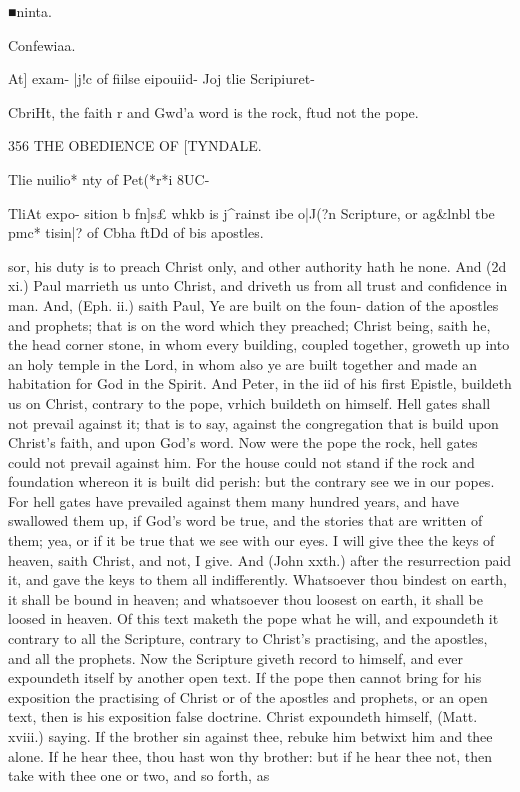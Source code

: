 \documentclass{custom}
\begin{document}
{■ninta. 

Confewiaa. 

At] exam- 
|j!c of fiilse 
eipouiid- 
Joj tlie 
Scripiuret- 

CbriHt, the 
faith r and 
Gwd'a word 
is the rock, 
ftud not the 
pope. 


356
THE OBEDIENCE OF
[TYNDALE.

Tlie nuilio* 
nty of 
Pet(*r*i 8UC- 

TliAt expo- 
sition b 
fn]s£ whkb 
is j^rainst 
ibe o|J(?n 
Scripture, 
or ag&lnbl 
tbe pmc* 
tisin|? of 
Cbha ftDd 
of bis 
apostles. 

sor, his duty is to preach Christ only, and other authority 
hath he none. And (2d xi.) Paul marrieth us unto 
Christ, and driveth us from all trust and confidence in man. 
And, (Eph. ii.) saith Paul, Ye are built on the foun- 
dation of the apostles and prophets; that is on the word 
which they preached; Christ being, saith he, the head 
corner stone, in whom every building, coupled together, 
groweth up into an holy temple in the Lord, in whom also 
ye are built together and made an habitation for God in 
the Spirit. And Peter, in the iid of his first Epistle, buildeth 
us on Christ, contrary to the pope, vrhich buildeth on 
himself. Hell gates shall not prevail against it; that is to 
say, against the congregation that is build upon Christ's 
faith, and upon God's word. Now were the pope the 
rock, hell gates could not prevail against him. For the 
house could not stand if the rock and foundation whereon 
it is built did perish: but the contrary see we in our popes. 
For hell gates have prevailed against them many hundred 
years, and have swallowed them up, if God's word be 
true, and the stories that are written of them; yea, or if 
it be true that we see with our eyes. I will give thee the 
keys of heaven, saith Christ, and not, I give. And (John 
xxth.) after the resurrection paid it, and gave the keys to 
them all indifferently. Whatsoever thou bindest on earth, 
it shall be bound in heaven; and whatsoever thou loosest 
on earth, it shall be loosed in heaven. Of this text maketh 
the pope what he will, and expoundeth it contrary to all 
the Scripture, contrary to Christ's practising, and the 
apostles, and all the prophets. Now the Scripture giveth 
record to himself, and ever expoundeth itself by another 
open text. If the pope then cannot bring for his exposition 
the practising of Christ or of the apostles and prophets, or 
an open text, then is his exposition false doctrine. Christ 
expoundeth himself, (Matt. xviii.) saying. If the brother 
sin against thee, rebuke him betwixt him and thee alone. 
If he hear thee, thou hast won thy brother: but if he hear 
thee not, then take with thee one or two, and so forth, as 


}
\end{document}
